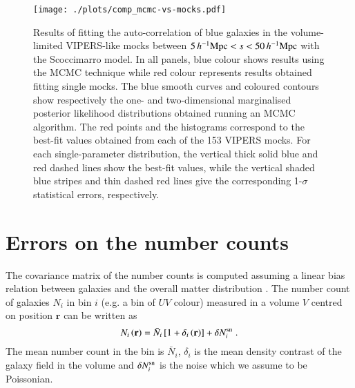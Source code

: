 \documentclass[longauth]{aa}
\def\({\left(}
\def\){\right)}
\def\[{\left[}
\def\]{\right]}
\def\mhmpc{\,h^{-1}{\rm Mpc}}
\begin{document}
\begin{figure}
\centering
	\texttt{[image: ./plots/comp\_mcmc-vs-mocks.pdf]}
		\caption{Results of fitting the auto-correlation of blue galaxies in the volume-limited VIPERS-like mocks between $5\mhmpc<s<50\mhmpc$ with the Scoccimarro model. In all panels, blue colour shows results using the MCMC technique while red colour represents results obtained fitting single mocks. The blue smooth curves and coloured contours show respectively the one- and two-dimensional marginalised posterior likelihood distributions obtained running an MCMC algorithm. The red points and the histograms correspond to the best-fit values obtained from each of the 153 VIPERS mocks. For each single-parameter distribution, the vertical thick solid blue and red dashed lines show the best-fit values, while the vertical shaded blue stripes and thin dashed red lines give the corresponding 1-$\sigma$ statistical errors, respectively.}\label{fig:mcmc-vs-mocks}
	\end{figure}









\section{Errors on the number counts} \label{app:err_pred}

The covariance matrix of the number counts is computed assuming a linear bias relation between galaxies and the overall matter distribution \citep[see e.g.][]{crocce10, hoffmann15}. The number count of galaxies $N_i$ in bin $i$ (e.g. a bin of $UV$ colour) measured in a volume $V$ centred on position $\mathbf{r}$ can be written as
	\begin{equation}
		N_i\(\mathbf{r}\)=\bar{N}_i\[1+\delta_i\(\mathbf{r}\)\]+\delta N_i^{\rm{sn}}\; .							\label{eq:ep0}
	\end{equation}
The mean number count in the bin is $\bar{N}_i$, $\delta_i$ is the mean density contrast of the galaxy field in the volume and $\delta N_i^{\rm{sn}}$ is the noise which we assume to be Poissonian.
\end{document}
